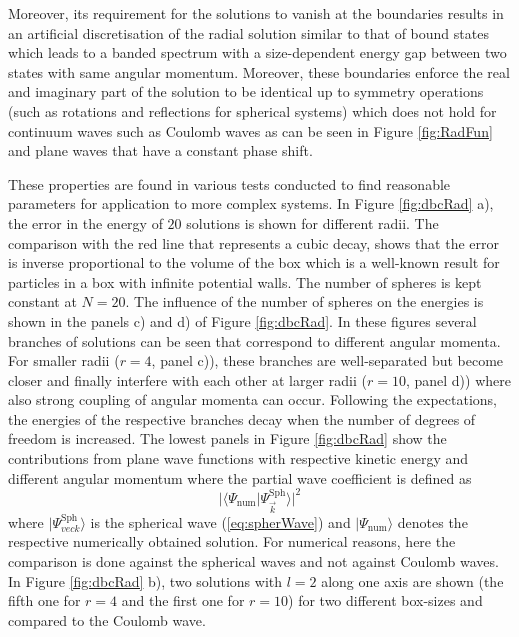 Moreover, its requirement for the solutions to vanish at the boundaries results in an artificial discretisation of the radial solution similar to that of bound states which leads to a banded spectrum with a size-dependent energy gap between two states with same angular momentum.
Moreover, these boundaries enforce the real and imaginary part of the solution to be identical up to symmetry operations (such as rotations and reflections for spherical systems) which does not hold for continuum waves such as Coulomb waves as can be seen in Figure \ref{fig:RadFun} and plane waves that have a constant phase shift.

These properties are found in various tests conducted to find reasonable parameters for application to more complex systems.
In Figure \ref{fig:dbcRad} a), the error in the energy of $20$ solutions is shown for different radii.
The comparison with the red line that represents a cubic decay, shows that the error is inverse proportional to the volume of the box which is a well-known result for particles in a box with infinite potential walls. 
The number of spheres is kept constant at $N=20$.
The influence of the number of spheres on the energies is shown in the panels c) and d) of Figure \ref{fig:dbcRad}.
In these figures several branches of solutions can be seen that correspond to different angular momenta.
For smaller radii ($r=4$, panel c)), these branches are well-separated but become closer and finally interfere with each other at larger radii ($r=10$, panel d)) where also strong coupling of angular momenta can occur.
Following the expectations, the energies of the respective branches decay when the number of degrees of freedom is increased.
The lowest panels in Figure \ref{fig:dbcRad} show the contributions from plane wave functions with respective kinetic energy and different angular momentum where the partial wave coefficient is defined as
\begin{equation} \label{eq:PartWaveCoeff}
|\langle \Psi_\text{num} | \Psi_{\vec{k}}^\text{Sph}\rangle |^2
\end{equation}
where $|\Psi_{vec{k}}^\text{Sph}\rangle$ is the spherical wave (\ref{eq:spherWave}) and $|\Psi_\text{num}\rangle$ denotes the respective numerically obtained solution.
For numerical reasons, here the comparison is done against the spherical waves and not against Coulomb waves.
In Figure \ref{fig:dbcRad} b), two solutions with $l=2$ along one axis are shown (the fifth one for $r=4$ and the first one for $r=10$) for two different box-sizes and compared to the Coulomb wave.

